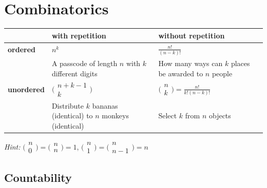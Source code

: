 \documentclass[11pt]{article}
\begin{document}
\section{Combinatorics}

\begin{table}[H]
\centering
\begin{tabular}{|p{2cm}|p{6cm}|p{6cm}|}
\hline
                   & \textbf{with repetition} & \textbf{without repetition} \\\hline
\textbf{ordered}   & $n^k$                         							 	  & $\frac{n!}{(n-k)!}$    \\\cline{2-3}
				   & A passcode of length $n$ with $k$ different digits           & How many ways can $k$ places be awarded to $n$ people                       \\\hline
\textbf{unordered} & $\bigl(\begin{smallmatrix}n+k-1\\k \end{smallmatrix} \bigr)$ & $\bigl(\begin{smallmatrix}n\\k \end{smallmatrix} \bigr) = \frac{n!}{k!(n-k)!}$ \\\cline{2-3}
				   & Distribute $k$ bananas (identical) to $n$ monkeys (identical)   & Select $k$ from $n$ objects                             \\\hline
\end{tabular}
\end{table}

\emph{Hint:} $\bigl(\begin{smallmatrix}n\\0 \end{smallmatrix} \bigr) = \bigl(\begin{smallmatrix}n\\n \end{smallmatrix} \bigr) = 1$, $\bigl(\begin{smallmatrix}n\\1 \end{smallmatrix} \bigr) = \bigl(\begin{smallmatrix}n\\n-1 \end{smallmatrix} \bigr) = n$

\subsection{Countability}
\end{document}
